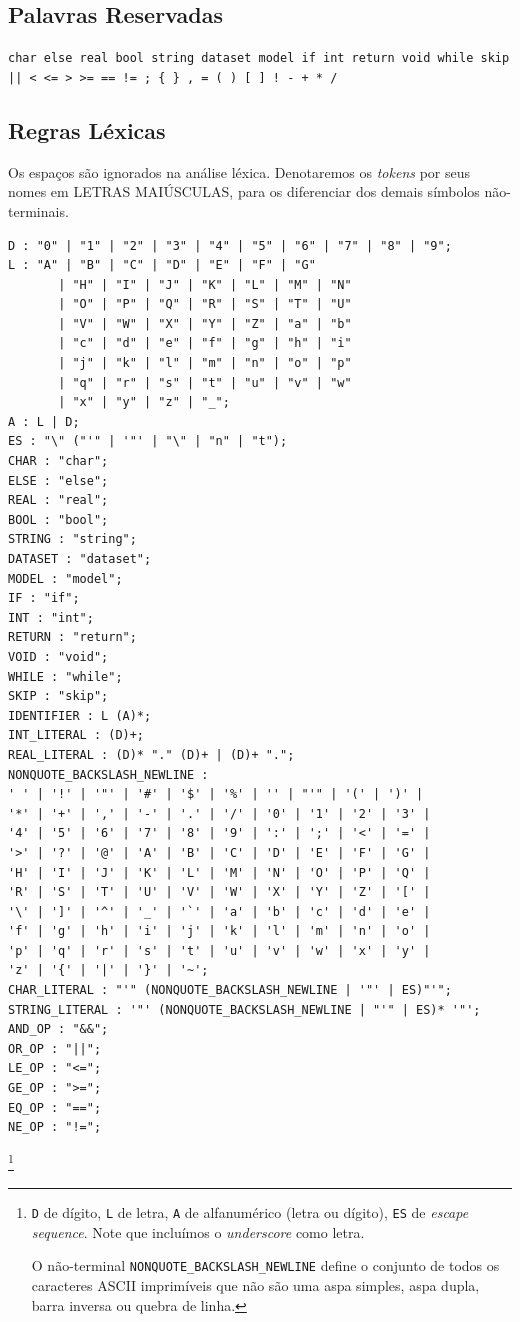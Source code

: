 \documentclass[12pt]{article}
\begin{document}
\subsection{Palavras Reservadas}
{\tt char else real bool string dataset model if int return void while skip \\ || < <= > >= == != ; \{ \} , = ( ) [ ] ! - + * /}
\subsection{Regras Léxicas}
Os espaços são ignorados na análise léxica.
Denotaremos os {\it tokens} por seus nomes em LETRAS MAIÚSCULAS, para os diferenciar dos demais símbolos não-terminais.

\begin{verbatim}
D : "0" | "1" | "2" | "3" | "4" | "5" | "6" | "7" | "8" | "9";
L : "A" | "B" | "C" | "D" | "E" | "F" | "G"
       | "H" | "I" | "J" | "K" | "L" | "M" | "N"
       | "O" | "P" | "Q" | "R" | "S" | "T" | "U"
       | "V" | "W" | "X" | "Y" | "Z" | "a" | "b"
       | "c" | "d" | "e" | "f" | "g" | "h" | "i"
       | "j" | "k" | "l" | "m" | "n" | "o" | "p"
       | "q" | "r" | "s" | "t" | "u" | "v" | "w"
       | "x" | "y" | "z" | "_";
A : L | D;
ES : "\" ("'" | '"' | "\" | "n" | "t");
CHAR : "char";
ELSE : "else";
REAL : "real";
BOOL : "bool";
STRING : "string";
DATASET : "dataset";
MODEL : "model";
IF : "if";
INT : "int";
RETURN : "return";
VOID : "void";
WHILE : "while";
SKIP : "skip";
IDENTIFIER : L (A)*;
INT_LITERAL : (D)+;
REAL_LITERAL : (D)* "." (D)+ | (D)+ ".";
NONQUOTE_BACKSLASH_NEWLINE :
' ' | '!' | '"' | '#' | '$' | '%' | '' | "'" | '(' | ')' | 
'*' | '+' | ',' | '-' | '.' | '/' | '0' | '1' | '2' | '3' | 
'4' | '5' | '6' | '7' | '8' | '9' | ':' | ';' | '<' | '=' | 
'>' | '?' | '@' | 'A' | 'B' | 'C' | 'D' | 'E' | 'F' | 'G' | 
'H' | 'I' | 'J' | 'K' | 'L' | 'M' | 'N' | 'O' | 'P' | 'Q' | 
'R' | 'S' | 'T' | 'U' | 'V' | 'W' | 'X' | 'Y' | 'Z' | '[' | 
'\' | ']' | '^' | '_' | '`' | 'a' | 'b' | 'c' | 'd' | 'e' | 
'f' | 'g' | 'h' | 'i' | 'j' | 'k' | 'l' | 'm' | 'n' | 'o' | 
'p' | 'q' | 'r' | 's' | 't' | 'u' | 'v' | 'w' | 'x' | 'y' | 
'z' | '{' | '|' | '}' | '~';
CHAR_LITERAL : "'" (NONQUOTE_BACKSLASH_NEWLINE | '"' | ES)"'";
STRING_LITERAL : '"' (NONQUOTE_BACKSLASH_NEWLINE | "'" | ES)* '"';
AND_OP : "&&";
OR_OP : "||";
LE_OP : "<=";
GE_OP : ">=";
EQ_OP : "==";
NE_OP : "!=";
\end{verbatim}
\footnote{\texttt{D} de dígito, \texttt{L} de letra, \texttt{A} de alfanumérico (letra ou dígito), \texttt{ES} de {\it escape sequence}.  Note que incluímos o {\it underscore} como letra.

O não-terminal \texttt{NONQUOTE\_BACKSLASH\_NEWLINE} define o conjunto de todos os caracteres ASCII imprimíveis que não são uma aspa simples, aspa dupla, barra inversa ou quebra de linha.}
\end{document}
